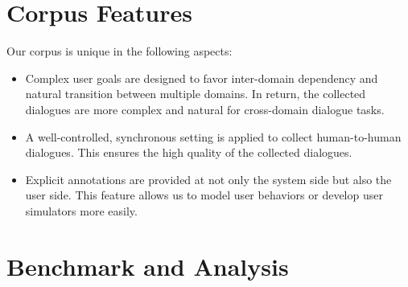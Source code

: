 \section{Corpus Features}
Our corpus is unique in the following aspects:
\begin{itemize}
    \item Complex user goals are designed to favor inter-domain dependency and natural transition between multiple domains. In return, the collected dialogues are more complex and natural for cross-domain dialogue tasks. 
    
    \item A well-controlled, synchronous setting is applied to collect human-to-human dialogues. This ensures the high quality of the collected dialogues.
    
    \item Explicit annotations are provided at not only the system side but also the user side. This feature allows us to model user behaviors or develop user simulators more easily.  
\end{itemize}

\section{Benchmark and Analysis}

